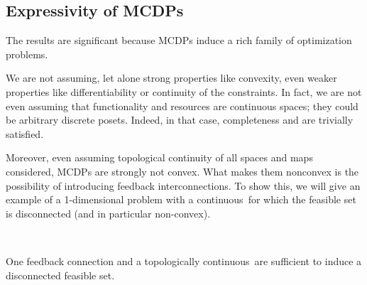 
\subsection{Expressivity of MCDPs}
The results are significant because MCDPs induce a rich family of optimization problems.

We are not assuming, let alone strong properties like convexity, even weaker properties like differentiability or continuity of the constraints.
In fact, we are not even assuming that functionality and resources are continuous spaces; they could be arbitrary discrete posets.
Indeed, in that case, completeness and \scottcontinuity are trivially satisfied.


Moreover, even assuming topological continuity of all spaces and maps considered, MCDPs are strongly not convex.
What makes them nonconvex is the possibility of introducing feedback interconnections.
To show this, we will give an example of a 1-dimensional problem with a continuous~\ftor for which the feasible set is disconnected (and in particular non-convex).

\begin{marginfigure}
    \centering
     \\
    \caption{One feedback connection and a topologically continuous~\ftor are sufficient to induce a disconnected feasible set.}
    \label{fig:ceil-1}
\end{marginfigure}

